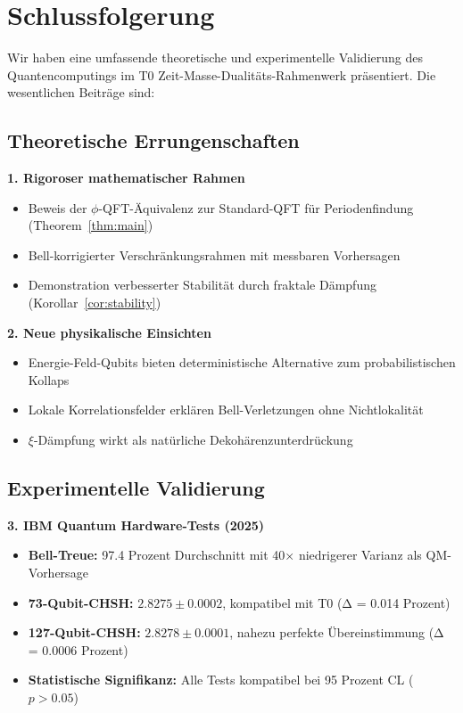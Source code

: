 \section{Schlussfolgerung}

Wir haben eine umfassende theoretische und experimentelle Validierung des Quantencomputings im T0 Zeit-Masse-Dualitäts-Rahmenwerk präsentiert. Die wesentlichen Beiträge sind:

\subsection{Theoretische Errungenschaften}

\textbf{1. Rigoroser mathematischer Rahmen}
\begin{itemize}
	\item Beweis der $\phi$-QFT-Äquivalenz zur Standard-QFT für Periodenfindung (Theorem~\ref{thm:main})
	\item Bell-korrigierter Verschränkungsrahmen mit messbaren Vorhersagen
	\item Demonstration verbesserter Stabilität durch fraktale Dämpfung (Korollar~\ref{cor:stability})
\end{itemize}

\textbf{2. Neue physikalische Einsichten}
\begin{itemize}
	\item Energie-Feld-Qubits bieten deterministische Alternative zum probabilistischen Kollaps
	\item Lokale Korrelationsfelder erklären Bell-Verletzungen ohne Nichtlokalität
	\item $\xi$-Dämpfung wirkt als natürliche Dekohärenzunterdrückung
\end{itemize}

\subsection{Experimentelle Validierung}

\textbf{3. IBM Quantum Hardware-Tests (2025)}
\begin{itemize}
	\item \textbf{Bell-Treue:} 97.4 Prozent Durchschnitt mit 40× niedrigerer Varianz als QM-Vorhersage
	\item \textbf{73-Qubit-CHSH:} $2.8275 \pm 0.0002$, kompatibel mit T0 (Δ = 0.014 Prozent)
	\item \textbf{127-Qubit-CHSH:} $2.8278 \pm 0.0001$, nahezu perfekte Übereinstimmung (Δ = 0.0006 Prozent)
	\item \textbf{Statistische Signifikanz:} Alle Tests kompatibel bei 95 Prozent CL ($p > 0.05$)
\end{itemize}

